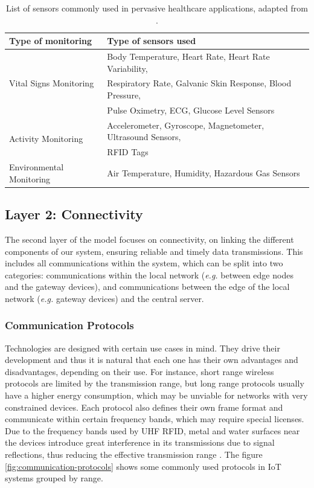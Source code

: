 \begin{table}[H]
    \centering
    \begin{tabular}{l|l}
        \textbf{Type of monitoring} & \textbf{Type of sensors used} \\ 
        \hline
        \multirow{3}{*}{Vital Signs Monitoring} & Body Temperature, Heart Rate, Heart Rate Variability, \\ & Respiratory Rate, Galvanic Skin Response, Blood Pressure, \\ & Pulse Oximetry, \acs{ECG}, Glucose Level Sensors \\ \hline
        \multirow{2}{*}{Activity Monitoring} & Accelerometer, Gyroscope, Magnetometer, Ultrasound Sensors,\\ & \acf{RFID} Tags\\
        \hline
        \multirow{1}{*}{Environmental Monitoring} & Air Temperature, Humidity, Hazardous Gas Sensors \\
    \end{tabular}
    \caption[List of sensors commonly used in pervasive healthcare applications]{List of sensors commonly used in pervasive healthcare applications, adapted from \cite{MinhDang2019}.}
    \label{tab:layer1-sensors}
\end{table}

\subsection{Layer 2: Connectivity}
\label{sec:iot-model-layer2}


The second layer of the model focuses on connectivity, on linking the different components of our system, ensuring reliable and timely data transmissions. This includes all communications within the system, which can be split into two categories: communications within the local network (\textit{e.g.} between edge nodes and the gateway devices), and communications between the edge of the local network (\textit{e.g.} gateway devices) and the central server. \bigskip

\subsubsection{Communication Protocols}

Technologies are designed with certain use cases in mind. They drive their development and thus it is natural that each one has their own advantages and disadvantages, depending on their use. For instance, short range wireless protocols are limited by the transmission range, but long range protocols usually have a higher energy consumption, which may be unviable for networks with very constrained devices. Each protocol also defines their own frame format and communicate within certain frequency bands, which may require special licenses. Due to the frequency bands used by UHF \acs{RFID}, metal and water surfaces near the devices introduce great interference in its transmissions due to signal reflections, thus reducing the effective transmission range \cite{Cairo2018}. The figure \ref{fig:communication-protocols} shows some commonly used protocols in \acs{IoT} systems grouped by range. 

